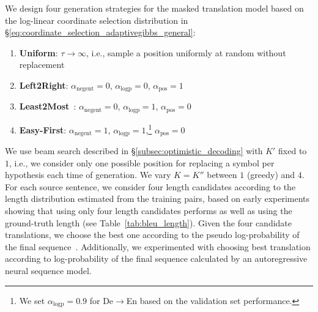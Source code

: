 \documentclass{article}
\begin{document}
\begin{table}[h!]
	\small
    
	\label{tab:bleu_length}
\end{table}

We design four generation strategies for the masked translation model based on the log-linear coordinate selection distribution in \S\ref{eq:coordinate_selection_adaptivegibbs_general}:
\begin{enumerate}
\itemsep 0em
    \item {\bf Uniform}: $\tau \to \infty$, i.e., sample a position uniformly at random without replacement 
    \item {\bf Left2Right}: $\alpha_{\text{negent}}=0$, $\alpha_{\text{logp}}=0$, $\alpha_{\text{pos}}=1$
    \item {\bf Least2Most}~\citep{ghazvininejad2019constant}: $\alpha_{\text{negent}}=0$, $\alpha_{\text{logp}}=1$, $\alpha_{\text{pos}}=0$
    \item {\bf Easy-First}: $\alpha_{\text{negent}}=1$, $\alpha_{\text{logp}}=1$,\footnote{
    We set $\alpha_{\text{logp}}=0.9$ for De$\to$En based on the validation set performance.
    } 
    $\alpha_{\text{pos}}=0$
\end{enumerate}

We use beam search described in \S\ref{subsec:optimistic_decoding} with $K'$ fixed to $1$, i.e., we consider only one possible position for replacing a symbol per hypothesis each time of generation. We vary $K = K''$ between $1$ (greedy) and $4$. For each source sentence, we consider four length candidates according to the length distribution estimated from the training pairs, 
based on early experiments showing that using only four length candidates performs as well as using the ground-truth length
(see Table~\ref{tab:bleu_length}). 
Given the four candidate translations,
we choose the best one according to the pseudo log-probability of the final sequence~\citep{wang2019bert}. Additionally, we experimented with choosing best translation according to log-probability of the final sequence calculated by an autoregressive neural sequence model. 
\end{document}
